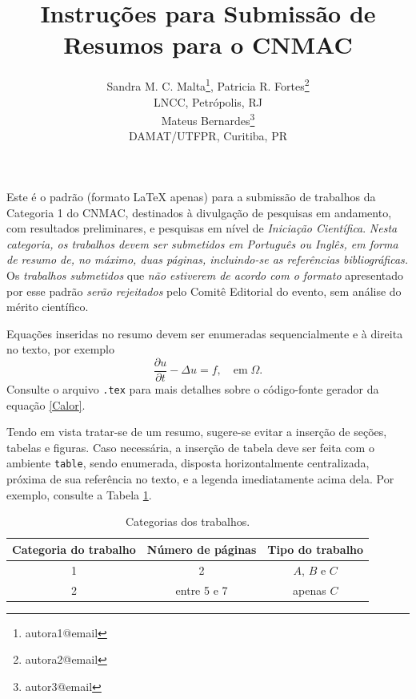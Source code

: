 \documentclass{pssbmac}
\begin{document}

\title{Instruções para Submissão de Resumos para o CNMAC}

\author{
    {\large Sandra M. C. Malta}\thanks{autora1@email}, {\large Patricia R. Fortes}\thanks{autora2@email}\\
    {\small LNCC, Petrópolis, RJ} \\
    {\large Mateus Bernardes}\thanks{autor3@email}  \\
    {\small DAMAT/UTFPR, Curitiba, PR} \\
}
\criartitulo



Este é o padrão (formato \LaTeX{} apenas) para a submissão de trabalhos da Categoria 1 do CNMAC, destinados à divulgação de pesquisas em andamento, com resultados preliminares, e pesquisas em nível de \emph{Iniciação Científica}. \emph{Nesta categoria, os trabalhos devem ser submetidos em Português ou Inglês, em forma de resumo de, no máximo, duas páginas, incluindo-se as referências bibliográficas.} Os \emph{trabalhos submetidos} que \emph{não estiverem de acordo com o formato} apresentado por esse padrão \emph{serão rejeitados} pelo Comitê Editorial do evento, sem análise do mérito científico.

Equações inseridas no resumo devem ser enumeradas sequencialmente e à direita no texto, por exemplo
\begin{equation}
\frac{\partial u}{\partial t}-\Delta u = f, \quad  \mathrm{em} \; \Omega. \label{Calor}
\end{equation}
Consulte o arquivo \verb!.tex! para mais detalhes sobre o código-fonte gerador da equação \eqref{Calor}.

Tendo em vista tratar-se de um resumo, sugere-se evitar a inserção de seções, tabelas e figuras. Caso necessária, a inserção de tabela deve ser feita com o ambiente \verb!table!, sendo enumerada, disposta horizontalmente centralizada, próxima de sua referência no texto, e a legenda imediatamente acima dela. Por exemplo, consulte a Tabela \ref{tabela01}.

\begin{table}[H]
\caption{ {\small Categorias dos trabalhos.}}
\centering
\begin{tabular}{ccc}
\hline
Categoria do trabalho  & Número de páginas & Tipo do trabalho\\ \hline
1          & 2  & $A$, $B$ e $C$    \\
2          & entre 5 e 7  & apenas $C$ \\
\hline
\end{tabular}\label{tabela01}
\end{table}
\end{document}
